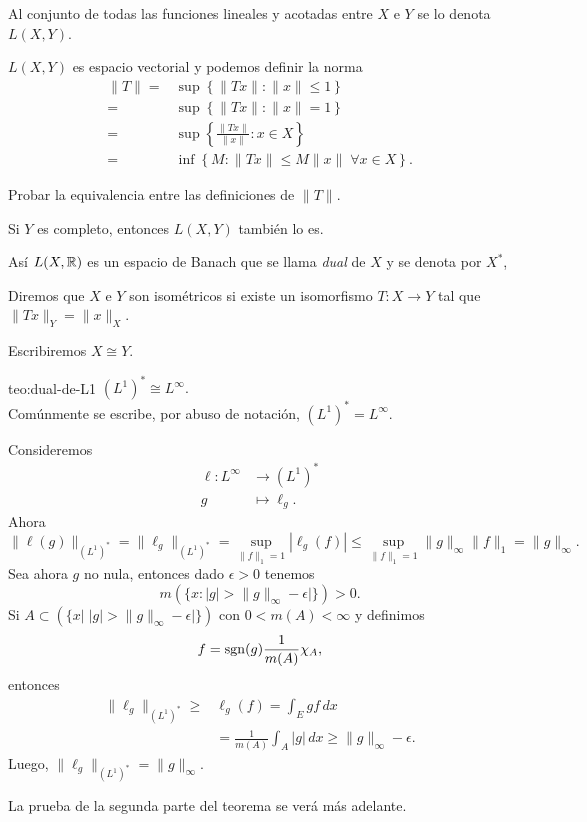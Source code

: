 Al conjunto de todas las funciones lineales y acotadas entre $X$ e $Y$ se lo denota $L(X,Y)$.

$L(X,Y)$ es espacio vectorial y podemos definir la norma
\[
\begin{split}
\|T\|=&\sup\left\{ \|Tx\|: \|x\|\leq 1\right\}\\
=&\sup\left\{ \|Tx\|: \|x\| = 1\right\}\\
=&\sup\left\{ \frac{\|Tx\|}{\|x\|}: x \in X\right\}\\
=&\inf\left\{ M: \|Tx\|\leq M \|x\|\;\forall x \in X\right\}.
\end{split}
\]

\begin{ejercicio}{}
Probar la equivalencia entre las definiciones de $\|T\|.$
\end{ejercicio}

\begin{ejercicio}{}
Si $Y$ es completo, entonces $L(X,Y)$ tambi\'en lo es.
\end{ejercicio}

As\'i $L(X,\mathbb{R})$ es un espacio de Banach que se llama \emph{dual} de $X$ y se denota por $X^*$,

Diremos que $X$ e $Y$ son isom\'etricos si existe un isomorfismo $T:X\to Y$ tal que $\|Tx\|_Y=\|x\|_X$. 

Escribiremos $X \cong Y$.

\begin{teorema}{teo:dual-de-L1}
$(L^1)^* \cong L^{\infty}.$
\\
Com\'unmente se escribe, por abuso de notaci\'on, $(L^1)^{*}=L^{\infty}$.
\end{teorema}

\begin{demo}
Consideremos
\[
\begin{split}
\ell:L^{\infty}  & \longrightarrow (L^1)^*
\\
g & \longmapsto \ell_g.
\end{split}
\]
Ahora 
\[
\|\ell(g)\|_{(L^1)^*}=\|\ell_g\|_{(L^1)^*}=
\sup\limits_{\|f\|_1 =1} |\ell_g(f)| \leq 
\sup \limits_{\|f\|_1=1} \|g\|_{\infty} \|f\|_1 =\|g\|_{\infty}.
\]
Sea ahora $g$ no nula, entonces dado $\epsilon>0$ tenemos
\[
m\left(\{x: |g|>\|g\|_{\infty}-\epsilon|  \}\right)>0.
\]
Si $A \subset \left(\{x \big|\; |g|>\|g\|_{\infty}-\epsilon|  \}\right)$
con $0<m(A)<\infty$ y definimos 
\[
f=\operatorname{sgn}(g) \frac{1}{m(A)} \chi_A,
\]
entonces
\[
\begin{split}
    \|\ell_g\|_{(L^1)^*} \geq& \ell_g(f)=\int_E gf\,dx 
    \\
    &= \frac{1}{m(A)} \int_A |g|\,dx\geq \|g\|_{\infty}-\epsilon.
\end{split}
\]
Luego, $\|\ell_g\|_{(L^1)^*}=\|g\|_{\infty}$.

La prueba de la segunda parte del teorema se ver\'a m\'as adelante.
\end{demo}

